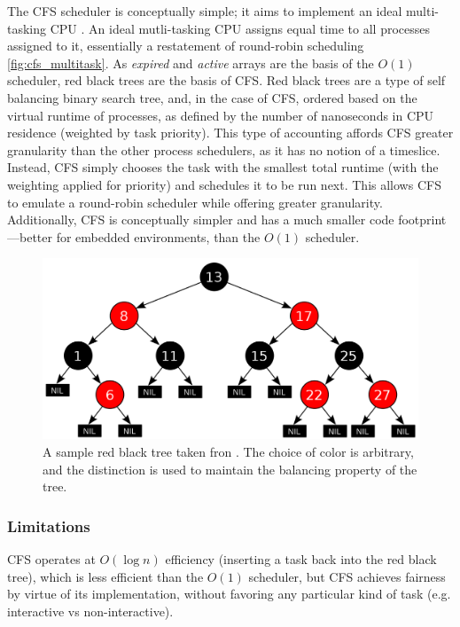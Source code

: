 \documentclass{sig-alternate-10pt}
\begin{document}
The CFS scheduler is conceptually simple; it aims to implement an ideal
multi-tasking CPU \cite{cfsdesign}. An ideal mutli-tasking CPU assigns equal
time to all processes assigned to it, essentially a restatement of
round-robin scheduling \ref{fig:cfs_multitask}. As \emph{expired} and
\emph{active} arrays are the basis of the $ O(1) $ scheduler, red black
trees are the basis of CFS. Red black trees are a type of self balancing
binary search tree, and, in the case of CFS, ordered based on the virtual
runtime of processes, as defined by the number of nanoseconds in CPU
residence (weighted by task priority). This type of accounting affords CFS
greater granularity than the other process schedulers, as it has no notion
of a timeslice. Instead, CFS simply chooses the task with the smallest total
runtime (with the weighting applied for priority) and schedules it to be run
next. This allows CFS to emulate a round-robin scheduler while offering
greater granularity. Additionally, CFS is conceptually simpler and has
a much smaller code footprint---better for embedded environments, than the
$ O(1) $ scheduler.

\begin{figure}
	\begin{center}
		\includegraphics[width=0.9\linewidth]{fig/rbtree.png}
		\caption{
			A sample red black tree taken fron \protect\cite{wiki:rbtree}. The choice of color is arbitrary, and the distinction is used to maintain the balancing property of the tree.
		}
		\label{fig:rbtree}
	\end{center}
\end{figure}

\subsubsection{Limitations}
CFS operates at $ O\left(\log n\right) $ efficiency (inserting
a task back into the red black tree), which is less efficient than the
$ O(1) $ scheduler, but CFS achieves fairness by virtue of its
implementation, without favoring any particular kind of task (e.g.
interactive vs non-interactive).
\end{document}
